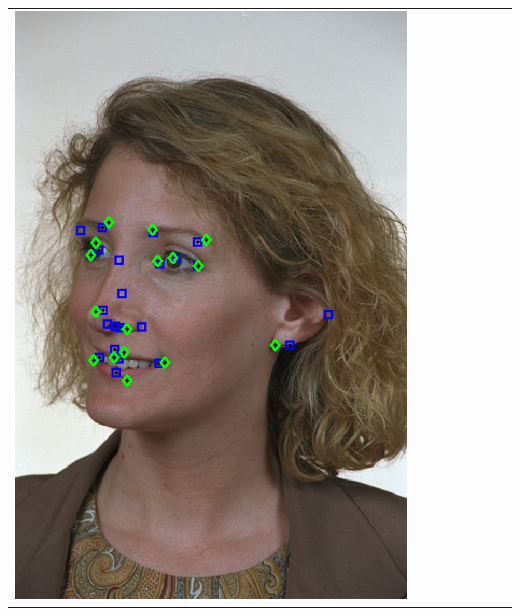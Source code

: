 \documentclass[landscape,final,a0paper,fontscale=0.27065]{baposter}
\begin{document}
\begin{poster}
{{\begin{tabular}{@{}rccccccc@{}}
 \parbox[c]{0.11\linewidth}{\includegraphics[width=\linewidth]{images/l_hl_success_2.pdf}} &

\end{tabular}}}
\end{poster}
\end{document}
